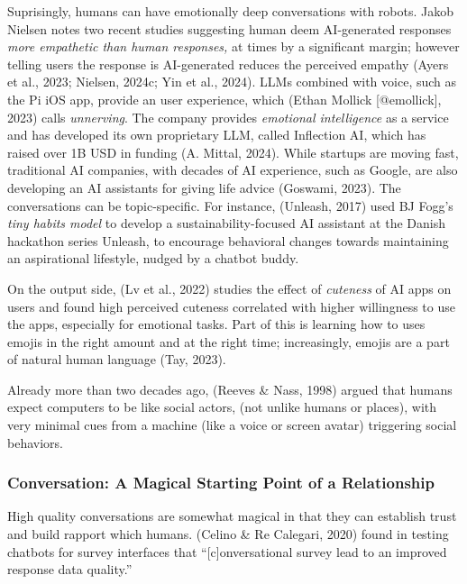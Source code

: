 \documentclass[
  letterpaper,
  DIV=11,
  numbers=noendperiod]{scrartcl}
\begin{document}
Suprisingly, humans can have emotionally deep conversations with robots.
Jakob Nielsen notes two recent studies suggesting human deem
AI-generated responses \emph{more empathetic than human responses,} at
times by a significant margin; however telling users the response is
AI-generated reduces the perceived empathy (Ayers et al., 2023; Nielsen,
2024c; Yin et al., 2024). LLMs combined with voice, such as the Pi iOS
app, provide an user experience, which (Ethan Mollick {[}@emollick{]},
2023) calls \emph{unnerving}. The company provides \emph{emotional
intelligence} as a service and has developed its own proprietary LLM,
called Inflection AI, which has raised over 1B USD in funding (A.
Mittal, 2024). While startups are moving fast, traditional AI companies,
with decades of AI experience, such as Google, are also developing an AI
assistants for giving life advice (Goswami, 2023). The conversations can
be topic-specific. For instance, (Unleash, 2017) used BJ Fogg's
\emph{tiny habits model} to develop a sustainability-focused AI
assistant at the Danish hackathon series Unleash, to encourage
behavioral changes towards maintaining an aspirational lifestyle, nudged
by a chatbot buddy.

On the output side, (Lv et al., 2022) studies the effect of
\emph{cuteness} of AI apps on users and found high perceived cuteness
correlated with higher willingness to use the apps, especially for
emotional tasks. Part of this is learning how to uses emojis in the
right amount and at the right time; increasingly, emojis are a part of
natural human language (Tay, 2023).

Already more than two decades ago, (Reeves \& Nass, 1998) argued that
humans expect computers to be like social actors, (not unlike humans or
places), with very minimal cues from a machine (like a voice or screen
avatar) triggering social behaviors.

\subsubsection{Conversation: A Magical Starting Point of a
Relationship}\label{conversation-a-magical-starting-point-of-a-relationship}

High quality conversations are somewhat magical in that they can
establish trust and build rapport which humans. (Celino \& Re Calegari,
2020) found in testing chatbots for survey interfaces that
``{[}c{]}onversational survey lead to an improved response data
quality.''
\end{document}
